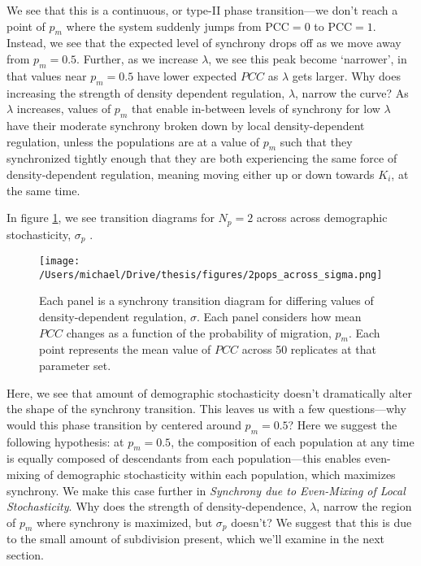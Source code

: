 We see that this is a continuous, or type-II phase transition---we don't
reach a point of \(p_m\) where the system suddenly jumps from
\(\text{PCC}= 0\) to \(\text{PCC}=1\). Instead, we see that the expected
level of synchrony drops off as we move away from \(p_m=0.5\). Further,
as we increase \(\lambda\), we see this peak become `narrower', in that
values near \(p_m = 0.5\) have lower expected \(PCC\) as \(\lambda\)
gets larger. Why does increasing the strength of density dependent
regulation, \(\lambda\), narrow the curve? As \(\lambda\) increases,
values of \(p_m\) that enable in-between levels of synchrony for low
\(\lambda\) have their moderate synchrony broken down by local
density-dependent regulation, unless the populations are at a value of
\(p_m\) such that they synchronized tightly enough that they are both
experiencing the same force of density-dependent regulation, meaning
moving either up or down towards \(K_i\), at the same time.

In figure \ref{2pops_across_sigma}, we see transition diagrams for
\(N_p=2\) across across demographic stochasticity, \(\sigma_p\) .

\begin{figure}[h]

\texttt{[image: /Users/michael/Drive/thesis/figures/2pops\_across\_sigma.png]}

\caption{Each panel is a synchrony transition diagram for differing values of density-dependent regulation, $\sigma$. Each panel considers how mean $PCC$ changes as a function of the probability of migration, $p_m$. Each point represents the mean value of $PCC$ across 50 replicates at that parameter set.}

\label{2pops_across_sigma}

\end{figure}

Here, we see that amount of demographic stochasticity doesn't
dramatically alter the shape of the synchrony transition. This leaves us
with a few questions---why would this phase transition by centered
around \(p_m = 0.5\)? Here we suggest the following hypothesis: at
\(p_m=0.5\), the composition of each population at any time is equally
composed of descendants from each population---this enables even-mixing
of demographic stochasticity within each population, which maximizes
synchrony. We make this case further in \emph{Synchrony due to
Even-Mixing of Local Stochasticity}. Why does the strength of
density-dependence, \(\lambda\), narrow the region of \(p_m\) where
synchrony is maximized, but \(\sigma_p\) doesn't? We suggest that this
is due to the small amount of subdivision present, which we'll examine
in the next section.

